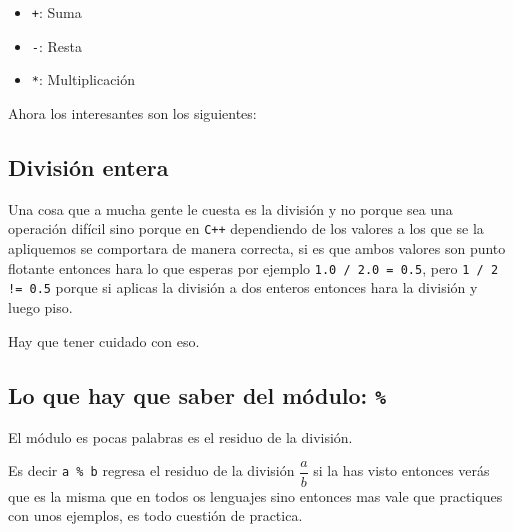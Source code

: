 \documentclass[12pt, fleqn]{report}                             %
\theoremstyle{break}                                            %
\newcommand \Cpp  {\texttt{C++} }                               %
\begin{document}
                \begin{itemize}
                    \item \texttt{+}: Suma
                    \item \texttt{-}: Resta
                    \item \texttt{*}: Multiplicación
                \end{itemize}

                Ahora los interesantes son los siguientes:

            \subsection{División entera}

                Una cosa que a mucha gente le cuesta es la división y no porque
                sea una operación difícil sino porque en \Cpp dependiendo de los
                valores a los que se la apliquemos se comportara de manera correcta,
                si es que ambos valores son punto flotante entonces hara lo que esperas
                por ejemplo \texttt{1.0 / 2.0 = 0.5}, pero \texttt{1 / 2 != 0.5} porque
                si aplicas la división a dos enteros entonces hara la división y luego piso.

                Hay que tener cuidado con eso.

            \subsection{Lo que hay que saber del módulo: \texttt{\%}}
            
                El módulo es pocas palabras es el residuo de la división.

                Es decir \texttt{a \% b} regresa el residuo de la división $\dfrac{a}{b}$
                si la has visto entonces verás que es la misma que en todos os lenguajes
                sino entonces mas vale que practiques con unos ejemplos, es todo cuestión
                de practica.

\end{document}
